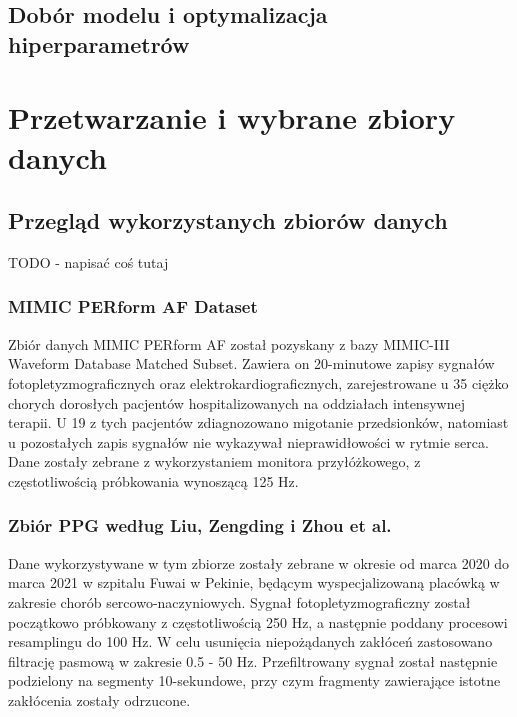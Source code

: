 \documentclass[a4paper,twoside,12pt]{book}
\begin{document}
\section{Dobór modelu i optymalizacja hiperparametrów}















\chapter{Przetwarzanie i wybrane zbiory danych}
\section{Przegląd wykorzystanych zbiorów danych}
TODO - napisać coś tutaj
\subsection{MIMIC PERform AF Dataset}
Zbiór danych MIMIC PERform AF\cite{mimic_perform_af} został pozyskany z bazy MIMIC-III Waveform Database Matched Subset\cite{mimiciii_waveform_matched}. Zawiera on 20-minutowe zapisy sygnałów fotopletyzmograficznych oraz elektrokardiograficznych, zarejestrowane u 35 ciężko chorych dorosłych pacjentów hospitalizowanych na oddziałach intensywnej terapii. U 19 z tych pacjentów zdiagnozowano migotanie przedsionków, natomiast u pozostałych zapis sygnałów nie wykazywał nieprawidłowości w rytmie serca. Dane zostały zebrane z wykorzystaniem monitora przyłóżkowego, z częstotliwością próbkowania wynoszącą 125 Hz.

\subsection{Zbiór PPG według Liu, Zengding i Zhou et al.}
Dane wykorzystywane w tym zbiorze\cite{liu2022multiclass} zostały zebrane w okresie od marca 2020 do marca 2021 w szpitalu Fuwai w Pekinie, będącym wyspecjalizowaną placówką w zakresie chorób sercowo-naczyniowych. Sygnał fotopletyzmograficzny został początkowo próbkowany z częstotliwością 250 Hz, a następnie poddany procesowi resamplingu do 100 Hz. W celu usunięcia niepożądanych zakłóceń zastosowano filtrację pasmową w zakresie 0.5 - 50 Hz. Przefiltrowany sygnał został następnie podzielony na segmenty 10-sekundowe, przy czym fragmenty zawierające istotne zakłócenia zostały odrzucone.
\end{document}
